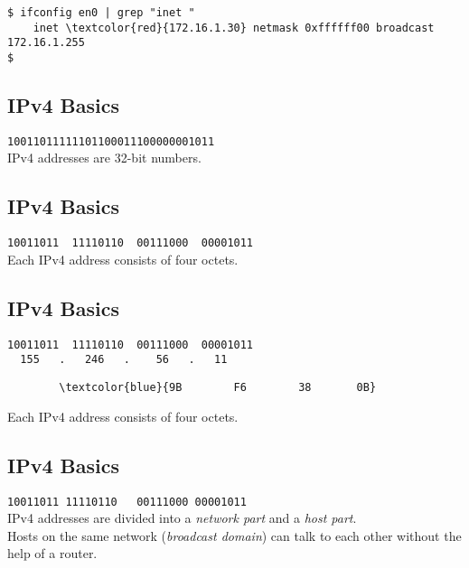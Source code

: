 \documentclass[xga]{xdvislides}
\begin{document}
\vspace{.25in}
\begin{Verbatim}
$ ifconfig en0 | grep "inet "
	inet \textcolor{red}{172.16.1.30} netmask 0xffffff00 broadcast 172.16.1.255
$ 
\end{Verbatim}

\subsection{IPv4 Basics}
\vspace{.5in}
\Hugesize
\begin{center}
\verb|10011011111101100011100000001011| \\
\vspace{.5in}
IPv4 addresses are 32-bit numbers.
\end{center}
\Normalsize

\subsection{IPv4 Basics}
\vspace{.5in}
\Hugesize
\begin{center}
\verb|10011011  11110110  00111000  00001011| \\
\vspace{.5in}
Each IPv4 address consists of four octets.
\end{center}
\Normalsize

\subsection{IPv4 Basics}
\vspace{.5in}
\Hugesize
\begin{center}
\verb|10011011  11110110  00111000  00001011| \\

\verb|  155   .   246   .    56   .   11| \\


\begin{Verbatim}
        \textcolor{blue}{9B        F6        38       0B}
\end{Verbatim}
\vspace{.5in}
Each IPv4 address consists of four octets.
\end{center}
\Normalsize


\subsection{IPv4 Basics}
\vspace{.5in}
\Hugesize
\begin{center}
\verb|10011011 11110110   00111000 00001011| \\
\vspace{.5in}
IPv4 addresses are divided into a {\em network part} and a {\em host part}. \\
\vspace{.25in}
Hosts on the same network ({\em broadcast domain}) can talk to each other
without the help of a router.
\end{center}
\Normalsize
\end{document}
